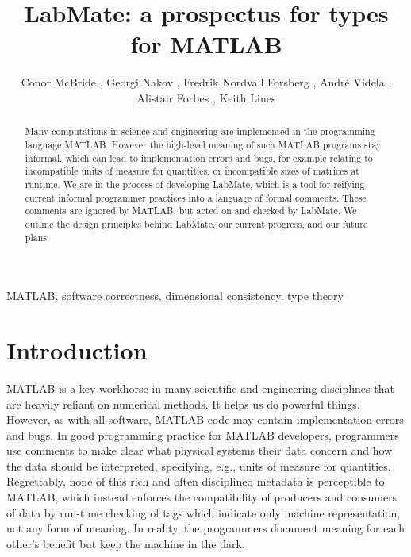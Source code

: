 \documentclass{IMEKO2024}
\begin{document}
\title{LabMate: a prospectus for types for MATLAB}
\author{Conor McBride  , Georgi Nakov  , Fredrik Nordvall Forsberg  , Andr\'e Videla  , Alistair Forbes  , Keith Lines  }

\maketitle

\begin{abstract}
  Many computations in science and engineering are implemented in the
  programming language MATLAB. However the high-level meaning of such
  MATLAB programs stay informal, which can lead to implementation
  errors and bugs, for example relating to incompatible units of
  measure for quantities, or incompatible sizes of matrices at
  runtime. We are in the process of developing LabMate, which is a
  tool for reifying current informal programmer practices into a
  language of formal comments. These comments are ignored by MATLAB,
  but acted on and checked by LabMate. We outline the design
  principles behind LabMate, our current progress, and our future
  plans.
\end{abstract}

\begin{keywords}
  MATLAB, software correctness, dimensional consistency, type theory
\end{keywords}

\section{Introduction}

MATLAB is a key workhorse in many scientific and engineering
disciplines that are heavily reliant on numerical methods. It helps us
do powerful things. However, as with all software, MATLAB code may
contain implementation errors and bugs. In good programming practice
for MATLAB developers, programmers use comments to make clear what
physical systems their data concern and how the data should be
interpreted, specifying, e.g., units of measure for
quantities. Regrettably, none of this rich and often disciplined
metadata is perceptible to MATLAB, which instead enforces the
compatibility of producers and consumers of data by run-time checking
of tags which indicate only machine representation, not any form of
meaning. In reality, the programmers document meaning for each other's
benefit but keep the machine in the dark.
\end{document}
